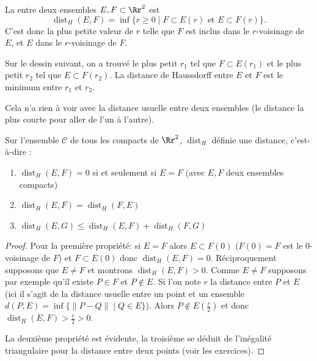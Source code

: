 \documentclass[11pt,class=report,crop=false]{standalone}
\DeclareMathOperator{\dist}{dist}
\newcommand{\commentfigure}[1]{#1} %
\begin{document}


La  entre deux ensembles $E, F \subset \Rr^2$
est
$$\dist_H(E,F) = \inf \big\{ r \ge 0 \mid F \subset E(r) \text{ et } E \subset F(r) \big\}.$$
C'est donc la plus petite valeur de $r$ telle que $F$ est inclus dans le $r$-voisinage de $E$,
et $E$ dans le $r$-voisinage de $F$.


Sur le dessin suivant, on a trouvé le plus petit $r_1$ tel que $F \subset E(r_1)$ et
le plus petit $r_2$ tel que $E \subset F(r_2)$. La distance de Haussdorff entre $E$ et $F$ est le minimum entre $r_1$ et $r_2$.



Cela n'a rien à voir avec la distance usuelle entre deux ensembles (le distance la plus courte pour aller 
de l'un à l'autre).

\begin{proposition}
\label{prop:haus}
Sur l'ensemble $\mathcal{C}$ de tous les compacts de $\Rr^2$, $\dist_H$ définie une distance,
c'est-à-dire :
\begin{enumerate}
  \item $\dist_H(E,F)=0$ si et seulement si $E=F$ (avec $E,F$ deux ensembles compacts)

  \item $\dist_H(E,F)=\dist_H(F,E)$

  \item $\dist_H(E,G) \le \dist_H(E,F)+\dist_H(F,G)$
\end{enumerate}

\end{proposition}

\begin{proof}
Pour la première propriété: 
si $E=F$ alors $E \subset F(0)$ ($F(0)=F$ est le $0$-voisinage de $F$) et $F \subset E(0)$ donc $\dist_H(E,F)=0$.
Réciproquement supposons que $E \neq F$ et montrons $\dist_H(E,F)>0$.
Comme $E\neq F$ supposons par exemple qu'il existe $P\in F$ et $P\notin E$.
Si l'on note $r$ la distance entre $P$ et $E$ (ici il s'agit de la distance
usuelle entre un point et un ensemble $d(P,E)=\inf\{ \|P-Q\| \mid Q \in E\}$).
Alors $P \notin E(\frac r 2)$ et donc $\dist_H(E,F) > \frac r2 >0$.

La deuxième propriété est évidente, la troisième se déduit 
de l'inégalité triangulaire pour la distance entre deux points (voir les exercices).
\end{proof}
\end{document}
